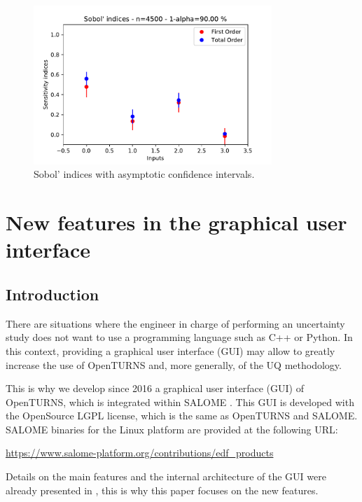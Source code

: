 \documentclass{article}
\begin{document}
\begin{figure}
\begin{center}
    \includegraphics[width=9cm]{figures/crue-Sobol-indices} 
\end{center}
\caption{Sobol' indices with asymptotic confidence intervals.}
\label{fig:sobolindices}
\end{figure}


\section{New features in the graphical user interface}

\subsection{Introduction}

There are situations where the engineer in charge of performing an uncertainty study does not want to use
a programming language such as C++ or Python. 
In this context, providing a graphical user interface (GUI) may allow to greatly increase the use of
OpenTURNS and, more generally, of the UQ methodology. 

This is why we develop since 2016 a graphical user interface (GUI) of OpenTURNS, which is integrated within 
SALOME \cite{SALOMEurl}. 
This GUI is developed with the OpenSource LGPL license, which is the same as OpenTURNS and SALOME. 
SALOME binaries for the Linux platform are provided at the following URL:
\begin{center}
\url{https://www.salome-platform.org/contributions/edf_products}
\end{center}
Details on the main features and the internal architecture of the GUI were already presented in \cite{OpenTURNSUncecomp17}, 
this is why this paper focuses on the new features. 
\end{document}
